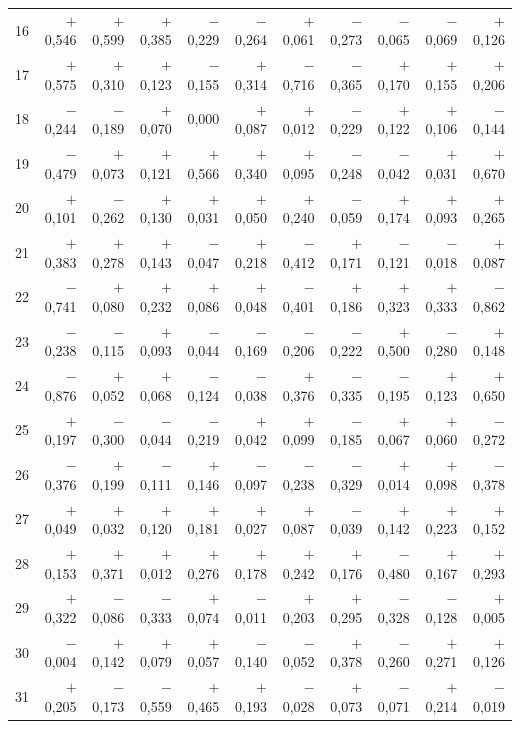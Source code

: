 \begin{tabular}{rrrrrrrrrrr}
16 & $+$0,546 & $+$0,599 & $+$0,385 & $-$0,229 & $-$0,264 & $+$0,061 & $-$0,273 & $-$0,065 & $-$0,069 & $+$0,126 \\
17 & $+$0,575 & $+$0,310 & $+$0,123 & $-$0,155 & $+$0,314 & $-$0,716 & $-$0,365 & $+$0,170 & $+$0,155 & $+$0,206 \\
18 & $-$0,244 & $-$0,189 & $+$0,070 & 0,000 & $+$0,087 & $+$0,012 & $-$0,229 & $+$0,122 & $+$0,106 & $-$0,144 \\
19 & $-$0,479 & $+$0,073 & $+$0,121 & $+$0,566 & $+$0,340 & $+$0,095 & $-$0,248 & $-$0,042 & $+$0,031 & $+$0,670 \\
20 & $+$0,101 & $-$0,262 & $+$0,130 & $+$0,031 & $+$0,050 & $+$0,240 & $-$0,059 & $+$0,174 & $+$0,093 & $+$0,265 \\
21 & $+$0,383 & $+$0,278 & $+$0,143 & $-$0,047 & $+$0,218 & $-$0,412 & $+$0,171 & $-$0,121 & $-$0,018 & $+$0,087 \\
22 & $-$0,741 & $+$0,080 & $+$0,232 & $+$0,086 & $+$0,048 & $-$0,401 & $+$0,186 & $+$0,323 & $+$0,333 & $-$0,862 \\
23 & $-$0,238 & $-$0,115 & $+$0,093 & $-$0,044 & $-$0,169 & $-$0,206 & $-$0,222 & $+$0,500 & $-$0,280 & $+$0,148 \\
24 & $-$0,876 & $+$0,052 & $+$0,068 & $-$0,124 & $-$0,038 & $+$0,376 & $-$0,335 & $-$0,195 & $+$0,123 & $+$0,650 \\
25 & $+$0,197 & $-$0,300 & $-$0,044 & $-$0,219 & $+$0,042 & $+$0,099 & $-$0,185 & $+$0,067 & $+$0,060 & $-$0,272 \\
26 & $-$0,376 & $+$0,199 & $-$0,111 & $+$0,146 & $-$0,097 & $-$0,238 & $-$0,329 & $+$0,014 & $+$0,098 & $-$0,378 \\
27 & $+$0,049 & $+$0,032 & $+$0,120 & $+$0,181 & $+$0,027 & $+$0,087 & $-$0,039 & $+$0,142 & $+$0,223 & $+$0,152 \\
28 & $+$0,153 & $+$0,371 & $+$0,012 & $+$0,276 & $+$0,178 & $+$0,242 & $+$0,176 & $-$0,480 & $+$0,167 & $+$0,293 \\
29 & $+$0,322 & $-$0,086 & $-$0,333 & $+$0,074 & $-$0,011 & $+$0,203 & $+$0,295 & $-$0,328 & $-$0,128 & $+$0,005 \\
30 & $-$0,004 & $+$0,142 & $+$0,079 & $+$0,057 & $-$0,140 & $-$0,052 & $+$0,378 & $-$0,260 & $+$0,271 & $+$0,126 \\
31 & $+$0,205 & $-$0,173 & $-$0,559 & $+$0,465 & $+$0,193 & $-$0,028 & $+$0,073 & $-$0,071 & $+$0,214 & $-$0,019 \\
\bottomrule
\end{tabular}
